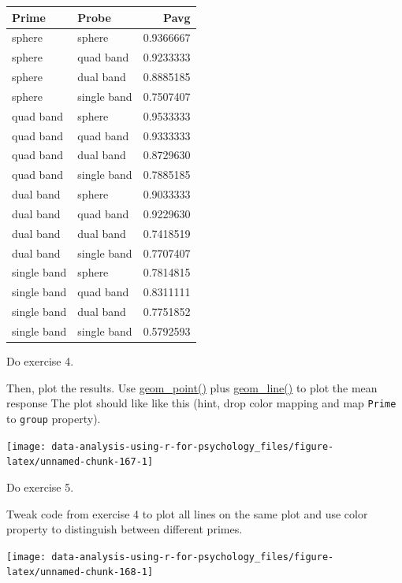 \documentclass[
]{book}
\begin{document}
\begin{tabular}{l|l|r}
\hline
Prime & Probe & Pavg\\
\hline
sphere & sphere & 0.9366667\\
\hline
sphere & quad band & 0.9233333\\
\hline
sphere & dual band & 0.8885185\\
\hline
sphere & single band & 0.7507407\\
\hline
quad band & sphere & 0.9533333\\
\hline
quad band & quad band & 0.9333333\\
\hline
quad band & dual band & 0.8729630\\
\hline
quad band & single band & 0.7885185\\
\hline
dual band & sphere & 0.9033333\\
\hline
dual band & quad band & 0.9229630\\
\hline
dual band & dual band & 0.7418519\\
\hline
dual band & single band & 0.7707407\\
\hline
single band & sphere & 0.7814815\\
\hline
single band & quad band & 0.8311111\\
\hline
single band & dual band & 0.7751852\\
\hline
single band & single band & 0.5792593\\
\hline
\end{tabular}

Do exercise 4.

Then, plot the results. Use \href{https://ggplot2.tidyverse.org/reference/geom_point.html}{geom\_point()} plus \href{https://ggplot2.tidyverse.org/reference/geom_path.html}{geom\_line()} to plot the mean response The plot should like like this (hint, drop color mapping and map \texttt{Prime} to \texttt{group} property).

\begin{center}\texttt{[image: data-analysis-using-r-for-psychology\_files/figure-latex/unnamed-chunk-167-1]} \end{center}

Do exercise 5.

Tweak code from exercise 4 to plot all lines on the same plot and use color property to distinguish between different primes.

\begin{center}\texttt{[image: data-analysis-using-r-for-psychology\_files/figure-latex/unnamed-chunk-168-1]} \end{center}
\end{document}
